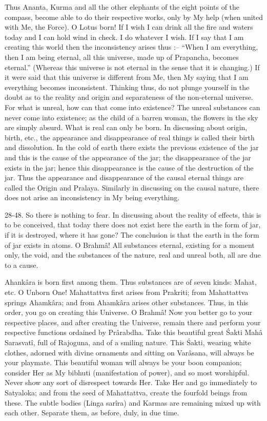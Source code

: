 Thus Ananta, Kurma and all the other elephants of the eight points of the compass, become able to do their respective works, only by My help (when united with Me, the Force). O Lotus born! If I wish I can drink all the fire and waters today and I can hold wind in check. I do whatever I wish. If I say that I am creating this world then the inconsistency arises thus :-- ``When I am everything, then I am being eternal, all this universe, made up of Prapancha, becomes eternal.'' (Whereas this universe is not eternal in the sense that it is changing.) If it were said that this universe is different from Me, then My saying that I am everything becomes inconsistent. Thinking thus, do not plunge yourself in the doubt as to the reality and origin and separateness of the non-eternal universe. For what is unreal, how can that come into existence? The unreal substances can never come into existence; as the child of a barren woman, the flowers in the sky are simply absurd. What is real can only be born. In discussing about origin, birth, etc., the appearance and disappearance of real things is called their birth and dissolution. In the cold of earth there exists the previous existence of the jar and this is the cause of the appearance of the jar; the disappearance of the jar exists in the jar; hence this disappearance is the cause of the destruction of the jar. Thus the appearance and disappearance of the causal eternal things are called the Origin and Pralaya. Similarly in discussing on the causal nature, there does not arise an inconsistency in My being everything.

28-48. So there is nothing to fear. In discussing about the reality of effects, this is to be conceived, that today there does not exist here the earth in the form of jar, if it is destroyed, where it has gone? The conclusion is that the earth in the form of jar exists in atoms. O Brahm\^a! All substances eternal, existing for a moment only, the void, and the substances of the nature, real and unreal both, all are due to a cause.

Ahank\^ara is born first among them. Thus substances are of seven kinds: Mahat, etc. O Unborn One! Mahattattva first arises from Prakriti; from Mahattattva springs Ahamk\^ara; and from Ahamk\^ara arises other substances. Thus, in this order, you go on creating this Universe. O Brahm\^a! Now you better go to your respective places, and after creating the Universe, remain there and perform your respective functions ordained by Pr\^arabdha. Take this beautiful great \'Sakti Mah\^a Sarasvat\^i, full of Rajoguna, and of a smiling nature. This \'Sakti, wearing white clothes, adorned with divine ornaments and sitting on Var\^asana, will always be your playmate. This beautiful woman will always be your boon companion; consider Her as My bibhuti (manifestation of power), and so most worshipful. Never show any sort of disrespect towards Her. Take Her and go immediately to Satyaloka; and from the seed of Mahattattva, create the fourfold beings from these. The subtle bodies (Linga sar\^ira) and Karmas are remaining mixed up with each other. Separate them, as before, duly, in due time.

